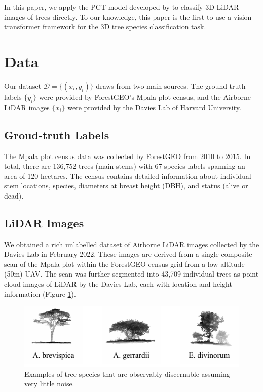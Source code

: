 \documentclass[letterpaper]{article} %
\begin{document}
In this paper, we apply the PCT model developed by \citealt{guo2021} to classify 3D LiDAR images of trees directly. To our knowledge, this paper is the first to use a vision transformer framework for the 3D tree species classification task. 

\section{Data}
Our dataset $\mathcal{D} = \{(x_i, y_i)\}$ draws from two main sources. The ground-truth labels $\{y_i\}$ were provided by ForestGEO's Mpala plot census, and the Airborne LiDAR images $\{x_i\}$ were provided by the Davies Lab of Harvard University.

\subsection{Groud-truth Labels}
The Mpala plot census data was collected by ForestGEO from 2010 to 2015. In total, there are 136,752 trees (main stems) with 67 species labels spanning an area of 120 hectares. The census contains detailed information about individual stem locations, species, diameters at breast height (DBH), and status (alive or dead). 

\subsection{LiDAR Images} We obtained a rich unlabelled dataset of Airborne LiDAR images collected by the Davies Lab in February 2022. These images are derived from a single composite scan of the Mpala plot within the ForestGEO census grid from a low-altitude (50m) UAV. The scan was further segmented into 43,709 individual trees as point cloud images of LiDAR by the Davies Lab, each with location and height information (Figure \ref{fig:species}).

\begin{figure}
    \centering
    \includegraphics[width=0.7\columnwidth]{species.pdf}
    \caption{Examples of tree species that are observably discernable assuming very little noise.}
    \label{fig:species}
\end{figure}
\end{document}
